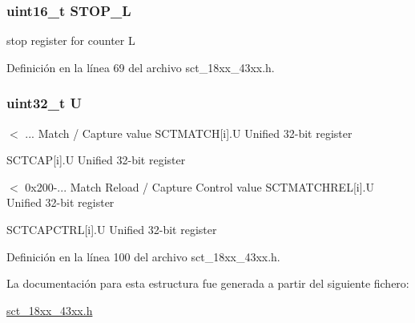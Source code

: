 \subsubsection[{\texorpdfstring{S\+T\+O\+P\+\_\+L}{STOP_L}}]{ uint16\+\_\+t S\+T\+O\+P\+\_\+L}\hypertarget{struct_l_p_c___s_c_t___t_a5d113d9e68dba87fe5cddba2692db050}{}\label{struct_l_p_c___s_c_t___t_a5d113d9e68dba87fe5cddba2692db050}
stop register for counter L 

Definición en la línea 69 del archivo sct\+\_\+18xx\+\_\+43xx.\+h.

\subsubsection[{\texorpdfstring{U}{U}}]{\setlength{\rightskip}{0pt plus 5cm}uint32\+\_\+t U}\hypertarget{struct_l_p_c___s_c_t___t_aa12d7d1d2c95315549032b6e19db5d03}{}\label{struct_l_p_c___s_c_t___t_aa12d7d1d2c95315549032b6e19db5d03}
$<$ ... Match / Capture value S\+C\+T\+M\+A\+T\+CH\mbox{[}i\mbox{]}.U Unified 32-\/bit register

S\+C\+T\+C\+AP\mbox{[}i\mbox{]}.U Unified 32-\/bit register

$<$ 0x200-\/... Match Reload / Capture Control value S\+C\+T\+M\+A\+T\+C\+H\+R\+EL\mbox{[}i\mbox{]}.U Unified 32-\/bit register

S\+C\+T\+C\+A\+P\+C\+T\+RL\mbox{[}i\mbox{]}.U Unified 32-\/bit register 

Definición en la línea 100 del archivo sct\+\_\+18xx\+\_\+43xx.\+h.



La documentación para esta estructura fue generada a partir del siguiente fichero\+:\begin{DoxyCompactItemize}
\item 
\hyperlink{sct__18xx__43xx_8h}{sct\+\_\+18xx\+\_\+43xx.\+h}\end{DoxyCompactItemize}
